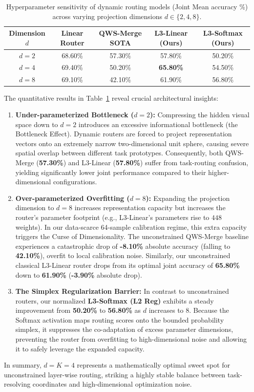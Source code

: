 \begin{table}[h]
\centering
\caption{Hyperparameter sensitivity of dynamic routing models (Joint Mean accuracy \%) across varying projection dimensions $d \in \{2, 4, 8\}$.}
\label{tab:dim_sensitivity}
\begin{tabular}{ccccc}
\toprule
\textbf{Dimension $d$} & \textbf{Linear Router} & \textbf{QWS-Merge SOTA} & \textbf{L3-Linear (Ours)} & \textbf{L3-Softmax (Ours)} \\
\midrule
$d = 2$ & 68.60\% & 57.30\% & 57.80\% & 50.20\% \\
$d = 4$ & 69.40\% & 50.20\% & \textbf{65.80\%} & 54.50\% \\
$d = 8$ & 69.10\% & 42.10\% & 61.90\% & 56.80\% \\
\bottomrule
\end{tabular}
\end{table}

The quantitative results in Table~\ref{tab:dim_sensitivity} reveal crucial architectural insights:
\begin{enumerate}
    \item \textbf{Under-parameterized Bottleneck ($d = 2$):} Compressing the hidden visual space down to $d=2$ introduces an excessive informational bottleneck (the Bottleneck Effect). Dynamic routers are forced to project representation vectors onto an extremely narrow two-dimensional unit sphere, causing severe spatial overlap between different task prototypes. Consequently, both QWS-Merge (\textbf{57.30\%}) and L3-Linear (\textbf{57.80\%}) suffer from task-routing confusion, yielding significantly lower joint performance compared to their higher-dimensional configurations.
    \item \textbf{Over-parameterized Overfitting ($d = 8$):} Expanding the projection dimension to $d=8$ increases representation capacity but increases the router's parameter footprint (e.g., L3-Linear's parameters rise to $448$ weights). In our data-scarce 64-sample calibration regime, this extra capacity triggers the Curse of Dimensionality. The unconstrained QWS-Merge baseline experiences a catastrophic drop of \textbf{-8.10\%} absolute accuracy (falling to \textbf{42.10\%}), overfit to local calibration noise. Similarly, our unconstrained classical L3-Linear router drops from its optimal joint accuracy of \textbf{65.80\%} down to \textbf{61.90\%} (\textbf{-3.90\%} absolute drop).
    \item \textbf{The Simplex Regularization Barrier:} In contrast to unconstrained routers, our normalized \textbf{L3-Softmax (L2 Reg)} exhibits a steady improvement from \textbf{50.20\%} to \textbf{56.80\%} as $d$ increases to 8. Because the Softmax activation maps routing scores onto the bounded probability simplex, it suppresses the co-adaptation of excess parameter dimensions, preventing the router from overfitting to high-dimensional noise and allowing it to safely leverage the expanded capacity.
\end{enumerate}
In summary, $d = K = 4$ represents a mathematically optimal sweet spot for unconstrained layer-wise routing, striking a highly stable balance between task-resolving coordinates and high-dimensional optimization noise.
